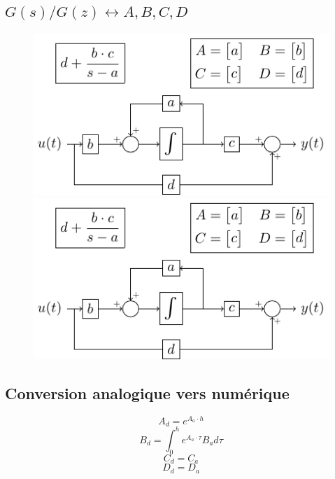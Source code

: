 \documentclass[resume]{subfiles}
\begin{document}
\subsection{$G(s) / G(z) \longleftrightarrow A,B,C,D$}
\begin{figure}[H]
\centering
\includegraphics[scale=1,page=1]{drwg_1.pdf}\\
\includegraphics[scale=1,page=2]{drwg_1.pdf}
\end{figure}

\subsection{Conversion analogique vers numérique}
$$A_d = e^{A_a\cdot h}$$
$$B_d = \int_0^h e^{A_a\cdot\tau}B_a d\tau$$
$$C_d = C_a$$
$$D_d = D_a$$
\end{document}
